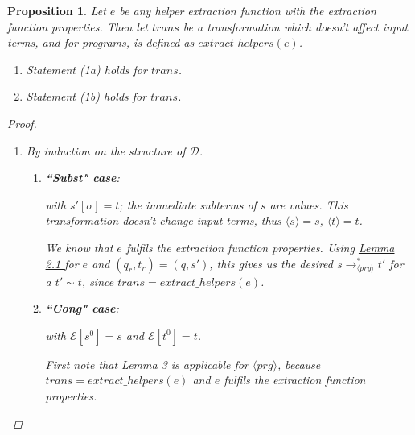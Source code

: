 \documentclass[11pt]{article} %
\newtheorem{proposition}{Proposition}
\begin{document}
\begin{proposition}

Let $e$ be any helper extraction function with the extraction function properties. Then let $trans$ be a transformation which doesn't affect input terms, and for programs, is defined as $extract\_helpers(e)$.

\begin{enumerate}

\item Statement (1a) holds for $trans$.

\item Statement (1b) holds for $trans$.

\end{enumerate}

\begin{proof} ~

\begin{enumerate}

\item By induction on the structure of $\mathcal{D}$.

\begin{enumerate}
\item \textbf{``Subst" case}:

\begin{prooftree}
\end{prooftree}

with $s'[\sigma] = t$; the immediate subterms of $s$ are values. This transformation doesn't change input terms, thus $\langle s \rangle = s$, $\langle t \rangle = t$.

We know that $e$ fulfils the extraction function properties. Using \hyperref[lemma2]{ Lemma 2.1 } for $e$ and $(q_r, t_r) = (q, s')$, this gives us the desired $s \longrightarrow_{\langle prg \rangle}^* t'$ for a $t' \sim t$, since $trans = extract\_helpers(e)$.

\item \textbf{``Cong" case}:

\begin{prooftree}
\end{prooftree}

with $\mathcal{E}[s^0] = s$ and $\mathcal{E}[t^0] = t$.

First note that Lemma 3 is applicable for $\langle prg \rangle$, because $trans = extract\_helpers(e)$ and $e$ fulfils the extraction function properties.


\end{enumerate}
\end{enumerate}
\end{proof}
\end{proposition}
\end{document}
